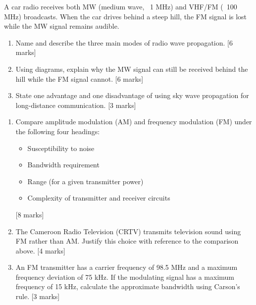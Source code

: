 \documentclass[11pt]{article}
\begin{document}
\begin{exercice}
A car radio receives both MW (medium wave, ~1 MHz) and VHF/FM (~100 MHz) broadcasts. When the car drives behind a steep hill, the FM signal is lost while the MW signal remains audible.
\begin{enumerate}
\item Name and describe the three main modes of radio wave propagation. [6 marks]
\item Using diagrams, explain why the MW signal can still be received behind the hill while the FM signal cannot. [6 marks]
\item State one advantage and one disadvantage of using sky wave propagation for long-distance communication. [3 marks]
\end{enumerate}
\end{exercice}

\begin{exercice}
\begin{enumerate}
\item Compare amplitude modulation (AM) and frequency modulation (FM) under the following four headings:
\begin{itemize}
\item Susceptibility to noise
\item Bandwidth requirement
\item Range (for a given transmitter power)
\item Complexity of transmitter and receiver circuits
\end{itemize}
[8 marks]
\item The Cameroon Radio Television (CRTV) transmits television sound using FM rather than AM. Justify this choice with reference to the comparison above. [4 marks]
\item An FM transmitter has a carrier frequency of 98.5 MHz and a maximum frequency deviation of 75 kHz. If the modulating signal has a maximum frequency of 15 kHz, calculate the approximate bandwidth using Carson's rule. [3 marks]
\end{enumerate}
\end{exercice}
\end{document}
